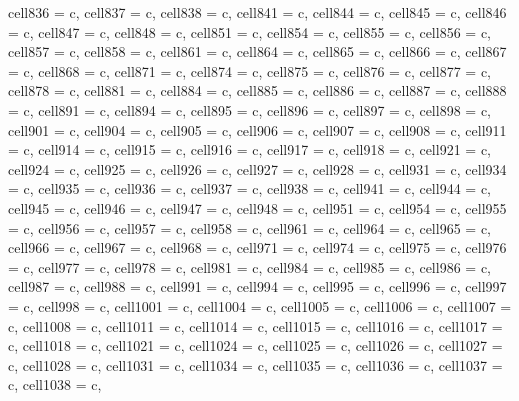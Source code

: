 \begin{longtblr}[
  label = none,
  entry = none,
]
{  cell{83}{6} = {c},
  cell{83}{7} = {c},
  cell{83}{8} = {c},
  cell{84}{1} = {c},
  cell{84}{4} = {c},
  cell{84}{5} = {c},
  cell{84}{6} = {c},
  cell{84}{7} = {c},
  cell{84}{8} = {c},
  cell{85}{1} = {c},
  cell{85}{4} = {c},
  cell{85}{5} = {c},
  cell{85}{6} = {c},
  cell{85}{7} = {c},
  cell{85}{8} = {c},
  cell{86}{1} = {c},
  cell{86}{4} = {c},
  cell{86}{5} = {c},
  cell{86}{6} = {c},
  cell{86}{7} = {c},
  cell{86}{8} = {c},
  cell{87}{1} = {c},
  cell{87}{4} = {c},
  cell{87}{5} = {c},
  cell{87}{6} = {c},
  cell{87}{7} = {c},
  cell{87}{8} = {c},
  cell{88}{1} = {c},
  cell{88}{4} = {c},
  cell{88}{5} = {c},
  cell{88}{6} = {c},
  cell{88}{7} = {c},
  cell{88}{8} = {c},
  cell{89}{1} = {c},
  cell{89}{4} = {c},
  cell{89}{5} = {c},
  cell{89}{6} = {c},
  cell{89}{7} = {c},
  cell{89}{8} = {c},
  cell{90}{1} = {c},
  cell{90}{4} = {c},
  cell{90}{5} = {c},
  cell{90}{6} = {c},
  cell{90}{7} = {c},
  cell{90}{8} = {c},
  cell{91}{1} = {c},
  cell{91}{4} = {c},
  cell{91}{5} = {c},
  cell{91}{6} = {c},
  cell{91}{7} = {c},
  cell{91}{8} = {c},
  cell{92}{1} = {c},
  cell{92}{4} = {c},
  cell{92}{5} = {c},
  cell{92}{6} = {c},
  cell{92}{7} = {c},
  cell{92}{8} = {c},
  cell{93}{1} = {c},
  cell{93}{4} = {c},
  cell{93}{5} = {c},
  cell{93}{6} = {c},
  cell{93}{7} = {c},
  cell{93}{8} = {c},
  cell{94}{1} = {c},
  cell{94}{4} = {c},
  cell{94}{5} = {c},
  cell{94}{6} = {c},
  cell{94}{7} = {c},
  cell{94}{8} = {c},
  cell{95}{1} = {c},
  cell{95}{4} = {c},
  cell{95}{5} = {c},
  cell{95}{6} = {c},
  cell{95}{7} = {c},
  cell{95}{8} = {c},
  cell{96}{1} = {c},
  cell{96}{4} = {c},
  cell{96}{5} = {c},
  cell{96}{6} = {c},
  cell{96}{7} = {c},
  cell{96}{8} = {c},
  cell{97}{1} = {c},
  cell{97}{4} = {c},
  cell{97}{5} = {c},
  cell{97}{6} = {c},
  cell{97}{7} = {c},
  cell{97}{8} = {c},
  cell{98}{1} = {c},
  cell{98}{4} = {c},
  cell{98}{5} = {c},
  cell{98}{6} = {c},
  cell{98}{7} = {c},
  cell{98}{8} = {c},
  cell{99}{1} = {c},
  cell{99}{4} = {c},
  cell{99}{5} = {c},
  cell{99}{6} = {c},
  cell{99}{7} = {c},
  cell{99}{8} = {c},
  cell{100}{1} = {c},
  cell{100}{4} = {c},
  cell{100}{5} = {c},
  cell{100}{6} = {c},
  cell{100}{7} = {c},
  cell{100}{8} = {c},
  cell{101}{1} = {c},
  cell{101}{4} = {c},
  cell{101}{5} = {c},
  cell{101}{6} = {c},
  cell{101}{7} = {c},
  cell{101}{8} = {c},
  cell{102}{1} = {c},
  cell{102}{4} = {c},
  cell{102}{5} = {c},
  cell{102}{6} = {c},
  cell{102}{7} = {c},
  cell{102}{8} = {c},
  cell{103}{1} = {c},
  cell{103}{4} = {c},
  cell{103}{5} = {c},
  cell{103}{6} = {c},
  cell{103}{7} = {c},
  cell{103}{8} = {c},
}
\end{longtblr}
